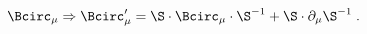 \begin{equation}
\label{e5:40}
\Bcirc_{\mu} \Rightarrow \Bcirc'_{\mu} = \S \cdot \Bcirc_{\mu} \cdot \S^{-1} +\S \cdot \partial_{\mu} \S^{-1} \; .
\end{equation} 
